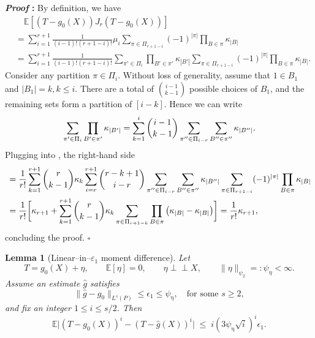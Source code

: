 \documentclass{article}
\def\eps{{\epsilon}}
\newcommand{\E}{\mathbb{E}}
\newtheorem{lemma}{Lemma}[section]
\renewenvironment{proof}{\noindent\textbf{\textit{Proof }:}}{\hfill$\square$}
\newcommand{\ind}{\perp\!\!\!\!\perp}
\begin{document}
\begin{proof}
    By definition, we have
    \begin{equation}
        \label{eq:cumulant-equiv-expression-1}
        \begin{aligned}
            &\quad \E[(T-g_0(X))J_r(T-g_0(X))] \\
            &= \sum_{i=1}^{r+1}\frac{1}{(i-1)!(r+1-i)!} \mu_i \sum_{\pi\in\Pi_{r+1-i}} (-1)^{|\pi|} \prod_{B\in\pi}\kappa_{|B|} \\
            &= \sum_{i=1}^{r+1}\frac{1}{(i-1)!(r+1-i)!} \sum_{\pi'\in\Pi_{i}}  \prod_{B'\in\pi'} \kappa_{|B'|} \sum_{\pi\in\Pi_{r+1-i}} (-1)^{|\pi|} \prod_{B\in\pi}\kappa_{|B|}.
        \end{aligned}
    \end{equation}
    Consider any partition $\pi\in\Pi_i$. Without loss of generality, assume that $1\in B_1$ and $|B_1| = k, k\leq i$. There are a total of $\binom{i-1}{k-1}$ possible choices of $B_1$, and the remaining sets form a partition of $[i-k]$. Hence we can write
    \begin{equation}
        \notag
        \sum_{\pi'\in\Pi_{i}}  \prod_{B'\in\pi'} \kappa_{|B'|} = \sum_{k=1}^i\binom{i-1}{k-1}\sum_{\pi''\in\Pi_{i-r}}\sum_{B''\in\pi''}\kappa_{|B''|}.
    \end{equation}
    Plugging into , the right-hand side
    \begin{equation}
        \notag
        \begin{aligned}
            &= \frac{1}{r!} \sum_{k=1}^{r+1}\binom{r}{k-1}\kappa_k\sum_{i=r}^{r+1}\binom{r-k+1}{i-r}\sum_{\pi''\in\Pi_{i-r}}\sum_{B''\in\pi''}\kappa_{|B''|}\sum_{\pi\in\Pi_{r+1-i}} (-1)^{|\pi|} \prod_{B\in\pi}\kappa_{|B|} \\
            &= \frac{1}{r!} \bigg[  \kappa_{r+1} + \sum_{k=1}^{r+1}\binom{r}{k-1}\kappa_k \sum_{\pi\in\Pi_{r+1-k}} \prod_{B\in\pi} \big(\kappa_{|B|} - \kappa_{|B|}\big) \bigg] = \frac{1}{r!}\kappa_{r+1},
        \end{aligned}
    \end{equation}
    concluding the proof.
\end{proof}


\begin{lemma}[Linear–in–$\varepsilon_1$ moment difference]\label{lem:lin-eps1}
Let  
\[
T=g_0(X)+\eta,\qquad \E[\eta]=0,\qquad 
\eta \ind X,\qquad 
\|\eta\|_{\psi_2}=:\psi_\eta<\infty.
\]
Assume an estimate $\hat g$ satisfies  
\[
\|\hat g-g_0\|_{L^{s}(P)}\le \eps_1 \leq \psi_{\upeta},
\quad\text{for some }s\ge 2,
\]
and fix an integer $1\le i\le s/2$.   
Then  
\begin{equation}\label{eq:lin-main}
\E\bigl|(T-g_0(X))^{i}-(T-\hat g(X))^{i}\bigr|
  \;\le\;
 i(3\psi_{\upeta}\sqrt{i})^i\eps_1.
\end{equation}
\end{lemma}
\end{document}
